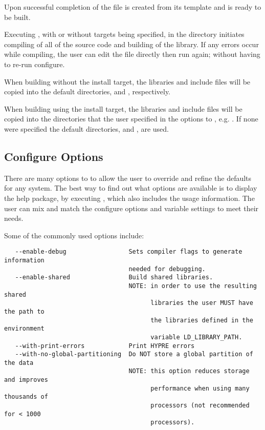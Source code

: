 Upon successful completion of  the file
 is created from its template
 and \hypre{} is ready to be built.

Executing , with or without targets being specified, in the
 directory initiates compiling of all of the source code and building
of the \hypre{} library.  If any errors occur while compiling, the user can edit
the file  directly then run  again;
without having to re-run configure.

When building \hypre{} without the install target, the libraries and include
files will be copied into the default directories,  and
, respectively.

When building \hypre{} using the install target, the libraries and include files
will be copied into the directories that the user specified in the options to
, e.g. .  If none were specified the
default directories,  and , are
used.


\subsection{Configure Options}\label{config_options}

There are many options to  to allow the user to override and
refine the defaults for any system. The best way to find out what options are
available is to display the help package, by executing , which also includes the usage information.  The user can mix and match
the configure options and variable settings to meet their needs.

Some of the commonly used options include:

\begin{verbatim}
   --enable-debug                 Sets compiler flags to generate information 
                                  needed for debugging.
   --enable-shared                Build shared libraries.
                                  NOTE: in order to use the resulting shared 
                                        libraries the user MUST have the path to
                                        the libraries defined in the environment 
                                        variable LD_LIBRARY_PATH. 
   --with-print-errors            Print HYPRE errors
   --with-no-global-partitioning  Do NOT store a global partition of the data
                                  NOTE: this option reduces storage and improves
                                        performance when using many thousands of
                                        processors (not recommended for < 1000 
                                        processors).


\end{verbatim}


